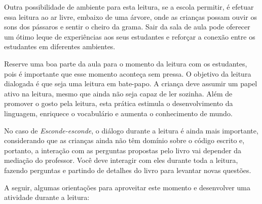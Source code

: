 \documentclass[11pt]{extarticle}
\begin{document}

Outra possibilidade de ambiente para esta leitura, se a escola permitir, 
é efetuar essa leitura ao ar livre, embaixo de uma árvore, onde as crianças 
possam ouvir os sons dos pássaros e sentir o cheiro da grama. Sair da sala 
de aula pode oferecer um ótimo leque de experiências aos seus estudantes e 
reforçar a conexão entre os estudantes em diferentes ambientes.  

Reserve uma boa parte da aula para o momento da leitura com os estudantes, 
pois é importante que esse momento aconteça sem pressa. O objetivo da 
leitura dialogada é que seja uma leitura em bate-papo. A criança deve 
assumir um papel ativo na leitura, mesmo que ainda não seja capaz de 
ler sozinha. Além de promover o gosto pela leitura, esta prática estimula 
o desenvolvimento da linguagem, enriquece o vocabulário e 
aumenta o conhecimento de mundo.

No caso de \textit{Esconde-esconde}, o diálogo durante a leitura é 
ainda mais importante, considerando que as crianças ainda não têm domínio sobre o código escrito e, portanto, a interação com as perguntas propostas pelo livro vai depender da mediação do professor. 
Você deve interagir com eles durante toda a 
leitura, fazendo perguntas e partindo de detalhes do livro para 
levantar novas questões. 

A seguir, algumas orientações para aproveitar este momento e desenvolver uma atividade durante a leitura: 
\end{document}
